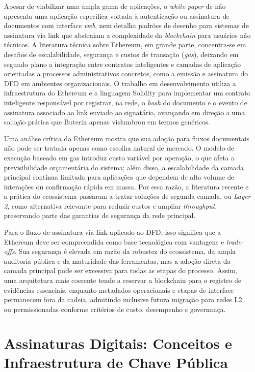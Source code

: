 \documentclass[
    12pt,
    a4paper,
    oneside,
    chapter=TITLE,
    section=TITLE,
    subsection=TITLE,
    subsubsection=TITLE,
    sumario=tradicional,
    english,
    brazil
]{abntex2}
\begin{document}
Apesar de viabilizar uma ampla gama de aplicações, o \emph{white
paper} de  não apresenta uma aplicação específica voltada à
autenticação ou assinatura de documentos com interface \emph{web},
nem detalha padrões de desenho para sistemas de assinatura via link
que abstraiam a complexidade da \emph{blockchain} para usuários não
técnicos. A literatura técnica sobre Ethereum, em grande parte,
concentra-se em desafios de escalabilidade, segurança e custos de
transação (\emph{gas}), deixando em segundo plano a integração entre
contratos inteligentes e camadas de aplicação orientadas a processos
administrativos concretos, como a emissão e assinatura do DFD em
ambientes organizacionais. O trabalho em desenvolvimento utiliza a
infraestrutura do Ethereum e a linguagem Solidity para implementar um
contrato inteligente responsável por registrar, na rede, o
\emph{hash} do documento e o evento de assinatura associado ao link
enviado ao signatário, avançando em direção a uma solução prática que
Buterin apenas vislumbrou em termos genéricos.

Uma análise crítica da Ethereum mostra que sua adoção para fluxos
documentais não pode ser tratada apenas como escolha natural de
mercado. O modelo de execução baseado em gas introduz custo variável
por operação, o que afeta a previsibilidade orçamentária do sistema;
além disso, a escalabilidade da camada principal continua limitada
para aplicações que dependem de alto volume de interações ou
confirmação rápida em massa. Por essa razão, a literatura recente e a
prática do ecossistema passaram a tratar soluções de segunda camada,
ou \emph{Layer 2}, como alternativa relevante para reduzir custos e ampliar
\emph{throughput}, preservando parte das garantias de segurança da rede
principal.

Para o fluxo de assinatura via link aplicado ao DFD, isso significa
que a Ethereum deve ser compreendida como base tecnológica com
vantagens e \emph{trade-offs}. Sua segurança é elevada em razão da robustez
do ecossistema, da ampla auditoria pública e da maturidade das
ferramentas, mas a adoção direta da camada principal pode ser
excessiva para todas as etapas do processo. Assim, uma arquitetura
mais coerente tende a reservar a blockchain para o registro de
evidências essenciais, enquanto metadados operacionais e etapas de
interface permanecem fora da cadeia, admitindo inclusive futura
migração para redes L2 ou permissionadas conforme critérios de custo,
desempenho e governança.

\section{Assinaturas Digitais: Conceitos e Infraestrutura de Chave Pública}
\end{document}
